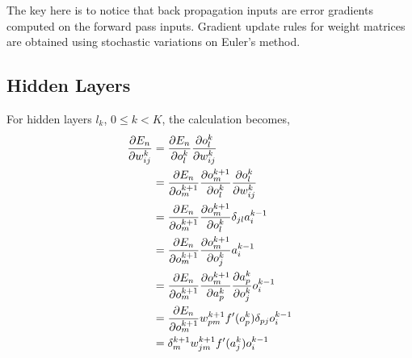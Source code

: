 \documentclass[12pt,notitlepage]{article}
\begin{document}
The key here is to notice that back propagation inputs are error
gradients computed on the forward pass inputs.  Gradient update rules for
weight matrices are obtained using stochastic variations on Euler's method.
\subsection{Hidden Layers}
\label{sec:hidden-layers}

For hidden layers $l_{k}$, $0 \le k < K$, the calculation becomes,
\begin{equation}
  \label{eq:error-grad-hidden}
  \begin{split}
    \frac{\partial E_{n}}{\partial w^{k}_{ij}} &=
    \frac{\partial E_{n}}{\partial o_{l}^{k}}\frac{\partial o_{l}^{k}}{\partial w_{ij}^{k}}\\
    &=
    \frac{\partial E_{n}}{\partial o_{m}^{k+1}}\frac{\partial o_{m}^{k+1}}{\partial o_{l}^{k}}\frac{\partial o_{l}^{k}}{\partial w_{ij}^{k}}\\
    &=
    \frac{\partial E_{n}}{\partial o_{m}^{k+1}}\frac{\partial o_{m}^{k+1}}{\partial o_{l}^{k}}\delta_{jl}a_{i}^{k-1}\\
    &=
    \frac{\partial E_{n}}{\partial o_{m}^{k+1}}\frac{\partial o_{m}^{k+1}}{\partial o_{j}^{k}}a_{i}^{k-1}\\
    &=
    \frac{\partial E_{n}}{\partial o_{m}^{k+1}}\frac{\partial o_{m}^{k+1}}{\partial a_{p}^{k}}\frac{\partial a_{p}^{k}}{\partial o_{j}^{k}}o_{i}^{k-1}\\ 
    &=
    \frac{\partial E_{n}}{\partial o_{m}^{k+1}}w_{pm}^{k+1}f'(o_{p}^{k})\delta_{pj}o_{i}^{k-1}\\ 
    &= \delta^{k+1}_{m}w_{jm}^{k+1}f'(a_{j}^{k})o_{i}^{k-1}\\
  \end{split}
\end{equation}
\end{document}
